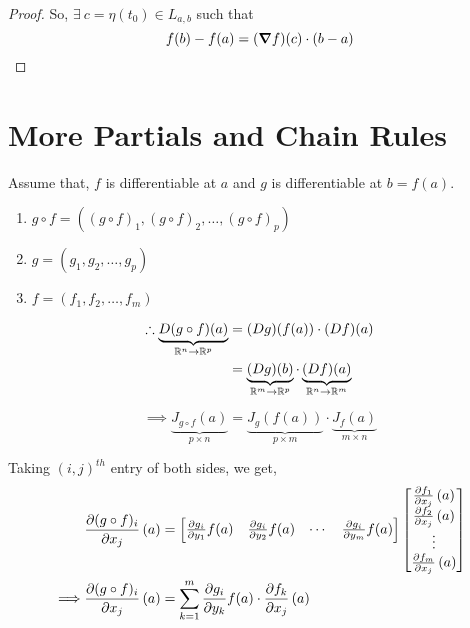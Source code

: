 \documentclass[../Analysis-3.tex]{subfiles}
\begin{document}
\begin{proof}
  So, $\exists\ c = \eta(t_0) \in L_{a,b}$ such that \[ f(b) - f(a) = (\grad f)(c)\cdot(b-a) \]
\end{proof}

\section{More Partials and Chain Rules}

Assume that, $f$ is differentiable at $a$ and $g$ is differentiable at $b = f(a)$.

\begin{notnBox}
  \begin{enumerate}
    \item $g \circ f = \left( (g \circ f)_1, (g \circ f)_2, \ldots, (g \circ f)_p \right)$
    \item $g = \left( g_1, g_2, \ldots, g_p \right)$
    \item $f = \left( f_1, f_2, \ldots, f_m \right)$
  \end{enumerate}
\end{notnBox}

\begin{align*}
  \therefore    \underbrace{D(g \circ f)(a)}_{\mathbb{R}^n \to \mathbb{R}^p} & = (Dg)(f(a))\cdot (Df)(a)                                                        \\
                                                             & = \underbrace{(Dg)(b)}_{\mathbb{R}^m \to \mathbb{R}^p}\cdot \underbrace{(Df)(a)}_{\mathbb{R}^n \to \mathbb{R}^m}
\end{align*}

\[\implies \underbrace{J_{g \circ f}(a)}_{p \times n} = \underbrace{J_{g}(f(a))}_{p \times m}\cdot \underbrace{J_{f}(a)}_{m \times n} \]

Taking $(i,j)^{th}$ entry of both sides, we get,
\begin{align*}
           & \pdv{(g\circ f)_{i}}{x_j}\left( a \right) = \begin{bmatrix}
                                                           \pdv{g_i}{y_1}f(a) & \pdv{g_i}{y_2}f(a) & \cdots & \pdv{g_i}{y_m}f(a)
                                                         \end{bmatrix} \begin{bmatrix}
                                                                         \pdv{f_1}{x_j}\left( a \right) \\
                                                                         \pdv{f_2}{x_j}\left( a \right) \\
                                                                         \vdots                         \\
                                                                         \pdv{f_m}{x_j}\left( a \right)
                                                                       \end{bmatrix}  \\
  \implies & \pdv{(g\circ f)_{i}}{x_j}\left( a \right) = \sum_{k = 1}^{m} \pdv{g_i}{y_k}f(a)\cdot\pdv{f_k}{x_j}\left( a \right)
\end{align*}
\end{document}
